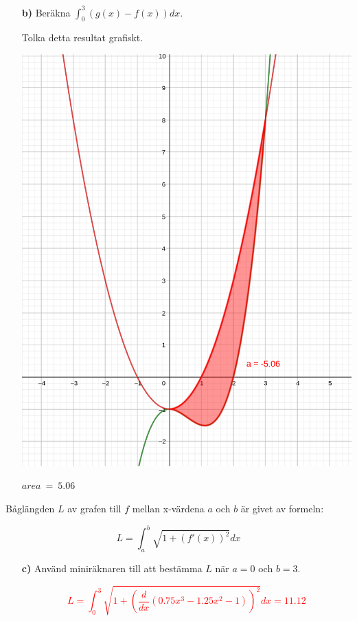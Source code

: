 \documentclass[12pt, letterpaper, twoside]{article}
\begin{document}
\begin{flushleft}
\begin{itemize}
	\pagebreak

    \item[\textbf{b)}]
    Beräkna $ \int^3_0(g(x)-f(x))dx $.


    Tolka detta resultat grafiskt.

    \hfill

	\includegraphics[scale=0.7]{graf2}

	$ area\ =\ 5.06 $

\end{itemize}

\hfill

Båglängden $ L $ av grafen till $ f $ mellan x-värdena $ a $ och $ b $ är givet av formeln:


$$ L = \int_a^b \sqrt{ 1+(f'(x))^2} dx $$

\begin{itemize}

    \item[\textbf{c)}]
    Använd miniräknaren till att bestämma $ L $ när $ a = 0 $ och $ b = 3 $.

    \hfill

    \textcolor{red}{
        $$  L = \int_0^3 \sqrt{ 1+(\frac{d}{dx}(0.75x^3 - 1.25x^2 -1))^2 } dx = 11.12 $$
    }


\end{itemize}

\end{flushleft}
\end{document}
